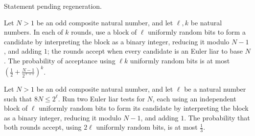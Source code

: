 \begin{theorem}
\label{Randomized.eulerLiarRounds_of_prime}
\leanok
{}
Statement pending regeneration.
\end{theorem}

\begin{theorem}
\label{Randomized.randProb_eulerLiarRounds_le}
\leanok
{}
Let $N>1$ be an odd composite natural number, and let $\ell,k$ be natural numbers. In
each of $k$ rounds, use a block of $\ell$ uniformly random bits to form a candidate by
interpreting the block as a binary integer, reducing it modulo $N-1$, and adding $1$;
the rounds accept when every candidate is an Euler liar to base $N$. The probability of
acceptance using $\ell k$ uniformly random bits is at most
$\left(\frac12+\frac{N-1}{2^{\ell+1}}\right)^k$.
\end{theorem}

\begin{theorem}
\label{Randomized.randProb_eulerLiarRounds_two_le}
\leanok
{}
Let $N>1$ be an odd composite natural number, and let $\ell$ be a natural number such
that $8N\le 2^\ell$. Run two Euler liar tests for $N$, each using an independent block
of $\ell$ uniformly random bits to form its candidate by interpreting the block as a
binary integer, reducing it modulo $N-1$, and adding $1$. The probability that both
rounds accept, using $2\ell$ uniformly random bits, is at most $\frac13$.
\end{theorem}
